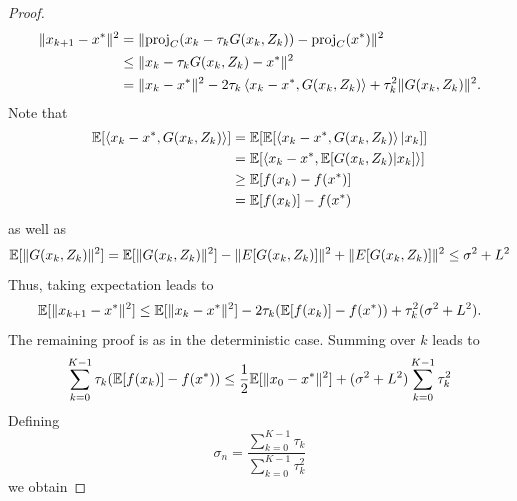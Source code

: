 \begin{proof}
    \begin{equation}
        \begin{aligned}
            \|x_{k+1}-x^*\|^2
            &= \|\mathrm{proj}_C(x_{k}-\tau_k G(x_k,Z_k))-\mathrm{proj}_C(x^*)\|^2\\
            &\leq \|x_{k}-\tau_k G(x_k,Z_k)-x^*\|^2\\
            &= \|x_{k}-x^*\|^2 - 2\tau_k\left\langle x_k-x^* , G(x_k,Z_k)\right\rangle + \tau_k^2\|G(x_k,Z_k)\|^2.
        \end{aligned}
    \end{equation}
    Note that
    \begin{equation}
        \begin{aligned}
            \mathbb{E}[\left\langle x_k-x^* , G(x_k,Z_k)\right\rangle]
            &= \mathbb{E}[\mathbb{E}[\left\langle x_k-x^* , G(x_k,Z_k)\right\rangle|x_k]]\\
            &= \mathbb{E}[\left\langle x_k-x^* , \mathbb{E}[G(x_k,Z_k)|x_k]\right\rangle]\\
            &\geq \mathbb{E}[f(x_k) - f(x^*)]\\
            &= \mathbb{E}[f(x_k)] - f(x^*)
        \end{aligned}
    \end{equation}
    as well as
    \begin{equation}
        \mathbb{E}[\|G(x_k,Z_k)\|^2] 
        = \mathbb{E}[\|G(x_k,Z_k)\|^2] - \|E[G(x_k,Z_k)]\|^2 + \|E[G(x_k,Z_k)]\|^2
        \leq \sigma^2 + L^2
    \end{equation}
    Thus, taking expectation leads to 
    \begin{equation}
        \begin{aligned}
            \mathbb{E}[\|x_{k+1}-x^*\|^2]
            \leq \mathbb{E}[\|x_{k}-x^*\|^2] - 2\tau_k (\mathbb{E}[f(x_k)] - f(x^*)) + \tau_k^2(\sigma^2 + L^2).
        \end{aligned}
    \end{equation}
    The remaining proof is as in the deterministic case. Summing over $k$ leads to
    \begin{equation}
        \begin{aligned}
            \sum_{k=0}^{K-1}\tau_k (\mathbb{E}[f(x_k)] - f(x^*))\leq \frac{1}{2}\mathbb{E}[\|x_{0}-x^*\|^2] + (\sigma^2 + L^2)\sum_{k=0}^{K-1}\tau_k^2
        \end{aligned}
    \end{equation}
    Defining
    \begin{equation}
        \sigma_n = \frac{\sum_{k=0}^{K-1}\tau_k}{\sum_{k=0}^{K-1}\tau_k^2}
    \end{equation}
    we obtain

\end{proof}
